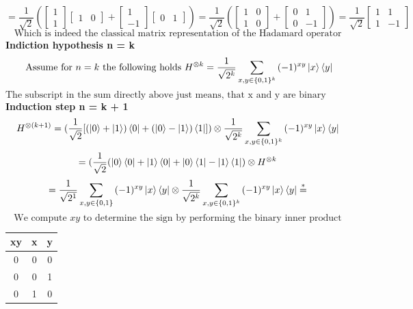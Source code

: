 \documentclass{article}
\begin{document}
\begin{framed}
$$    $$
    $$
    = \frac{1}{\sqrt2}(\begin{bmatrix}1 \\ 1\end{bmatrix}\begin{bmatrix}1 & 0\end{bmatrix} + \begin{bmatrix}1 \\ -1\end{bmatrix}\begin{bmatrix}0 & 1\end{bmatrix}) = \frac{1}{\sqrt{2}}(\begin{bmatrix}1 & 0 \\ 1 & 0\end{bmatrix}+\begin{bmatrix} 0 & 1 \\ 0 & -1\end{bmatrix}) = \frac{1}{\sqrt{2}}\begin{bmatrix}1 & 1 \\ 1 & -1\end{bmatrix}
    $$
    $$
    \text{Which is indeed the classical matrix representation of the Hadamard operator}
    $$
    \textbf{Indiction hypothesis n = k}
    $$
    \text{ Assume for } n = k \text{ the following holds } H^{\otimes k} = \frac{1}{\sqrt{2^k}}\sum_{x,y\in \{0,1\}^k}{(-1)^{xy}\ket{x}\bra{y}}
    $$
    $$
    \text{The subscript in the sum directly above just means, that x and y are binary strings of length k}
    $$
    \textbf{Induction step n = k + 1}
    $$
    H^{\otimes (k+1)} = (\frac{1}{\sqrt{2}}[(\ket{0}+\ket{1})\bra{0} + (\ket{0}-\ket{1})\bra{1}]) \otimes \frac{1}{\sqrt{2^k}}\sum_{x,y\in \{0,1\}^k}{(-1)^{xy}\ket{x}\bra{y}}
    $$
    $$
    = (\frac{1}{\sqrt{2}}(\ket{0}\bra{0} + \ket{1}\bra{0} + \ket{0}\bra{1} - \ket{1}\bra{1}) \otimes H^{\otimes k}
    $$
    $$
    = \frac{1}{\sqrt{2^1}}\sum_{x,y \in \{0, 1\}}{(-1)^{xy}\ket{x}\bra{y}} \otimes \frac{1}{\sqrt{2^k}}\sum_{x,y\in \{0,1\}^k}{(-1)^{xy}\ket{x}\bra{y}} \overset{*}{=}
    $$
    $$
    \text{We compute } xy \text{ to determine the sign by performing the binary inner product} 
    $$
\begin{table}[H] 
    \centering
    \begin{tabular}{|c|c|c|}
        \hline
        xy & x & y \\ 
        \hline
        0 & 0 & 0 \\
        0 & 0 & 1 \\
        0 & 1 & 0 \\

\end{tabular}
\end{table}
\end{framed}
\end{document}
